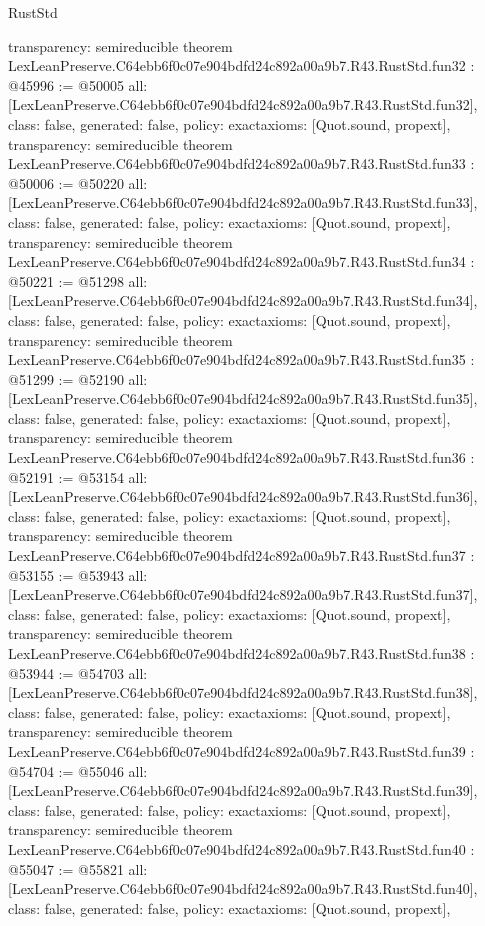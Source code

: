 \begin{lexlean}{RustStd}
\begin{coremodule}
{  transparency: semireducible
}
theorem LexLeanPreserve.C64ebb6f0c07e904bdfd24c892a00a9b7.R43.RustStd.fun32 : @45996 := @50005 {
  all: [LexLeanPreserve.C64ebb6f0c07e904bdfd24c892a00a9b7.R43.RustStd.fun32],
  class: false,
  generated: false,
  policy: exact{axioms: [Quot.sound, propext]},
  transparency: semireducible
}
theorem LexLeanPreserve.C64ebb6f0c07e904bdfd24c892a00a9b7.R43.RustStd.fun33 : @50006 := @50220 {
  all: [LexLeanPreserve.C64ebb6f0c07e904bdfd24c892a00a9b7.R43.RustStd.fun33],
  class: false,
  generated: false,
  policy: exact{axioms: [Quot.sound, propext]},
  transparency: semireducible
}
theorem LexLeanPreserve.C64ebb6f0c07e904bdfd24c892a00a9b7.R43.RustStd.fun34 : @50221 := @51298 {
  all: [LexLeanPreserve.C64ebb6f0c07e904bdfd24c892a00a9b7.R43.RustStd.fun34],
  class: false,
  generated: false,
  policy: exact{axioms: [Quot.sound, propext]},
  transparency: semireducible
}
theorem LexLeanPreserve.C64ebb6f0c07e904bdfd24c892a00a9b7.R43.RustStd.fun35 : @51299 := @52190 {
  all: [LexLeanPreserve.C64ebb6f0c07e904bdfd24c892a00a9b7.R43.RustStd.fun35],
  class: false,
  generated: false,
  policy: exact{axioms: [Quot.sound, propext]},
  transparency: semireducible
}
theorem LexLeanPreserve.C64ebb6f0c07e904bdfd24c892a00a9b7.R43.RustStd.fun36 : @52191 := @53154 {
  all: [LexLeanPreserve.C64ebb6f0c07e904bdfd24c892a00a9b7.R43.RustStd.fun36],
  class: false,
  generated: false,
  policy: exact{axioms: [Quot.sound, propext]},
  transparency: semireducible
}
theorem LexLeanPreserve.C64ebb6f0c07e904bdfd24c892a00a9b7.R43.RustStd.fun37 : @53155 := @53943 {
  all: [LexLeanPreserve.C64ebb6f0c07e904bdfd24c892a00a9b7.R43.RustStd.fun37],
  class: false,
  generated: false,
  policy: exact{axioms: [Quot.sound, propext]},
  transparency: semireducible
}
theorem LexLeanPreserve.C64ebb6f0c07e904bdfd24c892a00a9b7.R43.RustStd.fun38 : @53944 := @54703 {
  all: [LexLeanPreserve.C64ebb6f0c07e904bdfd24c892a00a9b7.R43.RustStd.fun38],
  class: false,
  generated: false,
  policy: exact{axioms: [Quot.sound, propext]},
  transparency: semireducible
}
theorem LexLeanPreserve.C64ebb6f0c07e904bdfd24c892a00a9b7.R43.RustStd.fun39 : @54704 := @55046 {
  all: [LexLeanPreserve.C64ebb6f0c07e904bdfd24c892a00a9b7.R43.RustStd.fun39],
  class: false,
  generated: false,
  policy: exact{axioms: [Quot.sound, propext]},
  transparency: semireducible
}
theorem LexLeanPreserve.C64ebb6f0c07e904bdfd24c892a00a9b7.R43.RustStd.fun40 : @55047 := @55821 {
  all: [LexLeanPreserve.C64ebb6f0c07e904bdfd24c892a00a9b7.R43.RustStd.fun40],
  class: false,
  generated: false,
  policy: exact{axioms: [Quot.sound, propext]},
}
\end{coremodule}
\end{lexlean}
